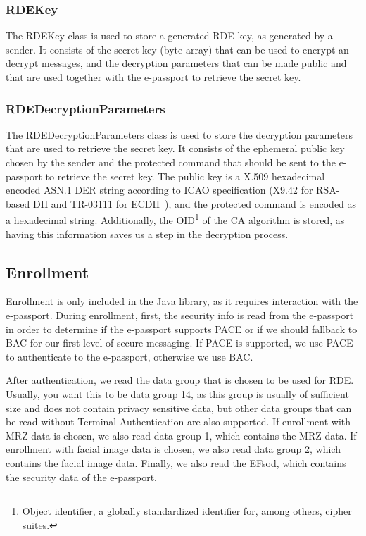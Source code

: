 \subsubsection{\textsf{RDEKey}}\label{subsubsec:rdekey}
The \textsf{RDEKey} class is used to store a generated RDE key, as generated by a sender.
It consists of the secret key (byte array) that can be used to encrypt an decrypt messages, and the decryption parameters that can be made public and that are used together with the e-passport to retrieve the secret key.

\subsubsection{\textsf{RDEDecryptionParameters}}\label{subsubsec:rde-decryption-parameters}
The \textsf{RDEDecryptionParameters} class is used to store the decryption parameters that are used to retrieve the secret key.
It consists of the ephemeral public key chosen by the sender and the protected command that should be sent to the e-passport to retrieve the secret key.
The public key is a X.509 hexadecimal encoded ASN.1 DER string according to ICAO specification (X9.42 for RSA-based DH and TR-03111 for ECDH~\cite{icao9303securitymechanisms}), and the protected command is encoded as a hexadecimal string.
Additionally, the OID\footnote{Object identifier, a globally standardized identifier for, among others, cipher suites.} of the CA algorithm is stored, as having this information saves us a step in the decryption process.

\subsection{Enrollment}\label{subsec:enrollment}
Enrollment is only included in the Java library, as it requires interaction with the e-passport.
During enrollment, first, the security info is read from the e-passport in order to determine if the e-passport supports PACE or if we should fallback to BAC for our first level of secure messaging.
If PACE is supported, we use PACE to authenticate to the e-passport, otherwise we use BAC.

After authentication, we read the data group that is chosen to be used for RDE.
Usually, you want this to be data group 14, as this group is usually of sufficient size and does not contain privacy sensitive data, but other data groups that can be read without Terminal Authentication are also supported.
If enrollment with MRZ data is chosen, we also read data group 1, which contains the MRZ data.
If enrollment with facial image data is chosen, we also read data group 2, which contains the facial image data.
Finally, we also read the EFsod, which contains the security data of the e-passport.

